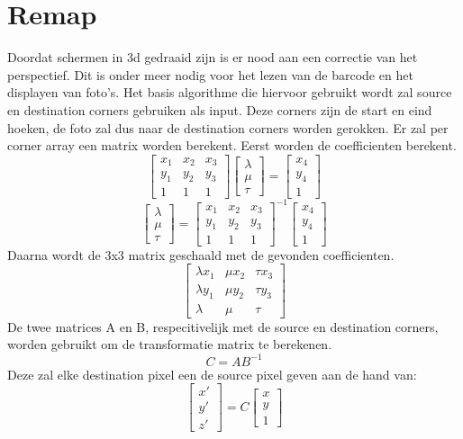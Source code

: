 \section{Remap}
Doordat schermen in 3d gedraaid zijn is er nood aan een correctie van het perspectief. Dit is onder meer nodig voor het lezen van de barcode en het displayen van foto's. Het basis algorithme die hiervoor gebruikt wordt zal source en destination corners gebruiken als input. Deze corners zijn de start en eind hoeken, de foto zal dus naar de destination corners worden gerokken. Er zal per corner array een matrix worden berekent. Eerst worden de coefficienten berekent.
$$ \begin{bmatrix}
x_1 & x_2 & x_3 \\ y_1 & y_2 & y_3 \\ 1 & 1 & 1
\end{bmatrix} \begin{bmatrix}
\lambda \\ \mu \\ \tau
\end{bmatrix} =
\begin{bmatrix}
x_4 \\ y_4 \\ 1
\end{bmatrix}
$$
$$ \begin{bmatrix}
\lambda \\ \mu \\ \tau
\end{bmatrix} =\begin{bmatrix}
x_1 & x_2 & x_3 \\ y_1 & y_2 & y_3 \\ 1 & 1 & 1
\end{bmatrix}^{-1}
\begin{bmatrix}
x_4 \\ y_4 \\ 1
\end{bmatrix}
$$
Daarna wordt de 3x3 matrix geschaald met de gevonden coefficienten.
$$
\begin{bmatrix}
\lambda x_1 & \mu x_2 & \tau x_3 \\ \lambda y_1 & \mu y_2 & \tau y_3 \\ \lambda & \mu & \tau
\end{bmatrix}
$$
De twee matrices A en B, respecitivelijk met de source en destination corners, worden gebruikt om de transformatie matrix te berekenen.
$$ C = AB^{-1}$$
Deze zal elke destination pixel een de source pixel geven aan de hand van:
$$
\begin{bmatrix}
x' \\ y' \\ z'
\end{bmatrix} = C\begin{bmatrix}
x \\ y \\ 1
\end{bmatrix}
$$
